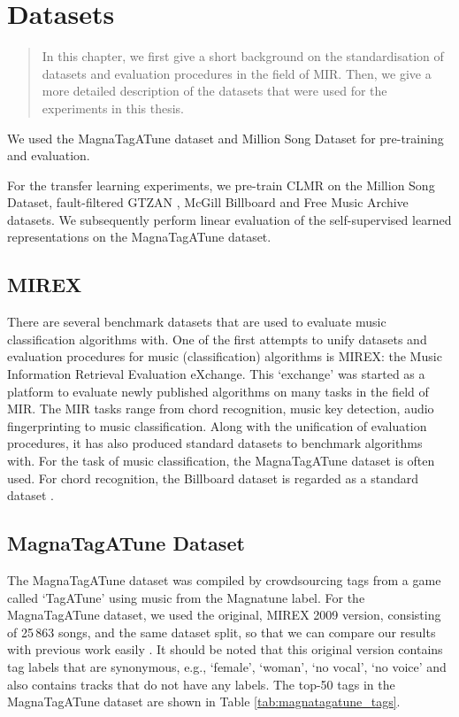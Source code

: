 \chapter{Datasets}

\begin{quote}
    In this chapter, we first give a short background on the standardisation of datasets and evaluation procedures in the field of MIR. Then, we give a more detailed description of the datasets that were used for the experiments in this thesis.
\end{quote}

We used the MagnaTagATune dataset and Million Song Dataset \cite{Bertin-Mahieux2011} for pre-training and evaluation.

For the transfer learning experiments, we pre-train CLMR on the Million Song Dataset, fault-filtered GTZAN \cite{tzanetakis2002musical,sturm2013gtzan}, McGill Billboard \cite{burgoyne_billboard} and Free Music Archive \cite{fma_dataset} datasets.
We subsequently perform linear evaluation of the self-supervised learned representations on the MagnaTagATune dataset.

\section{MIREX}
There are several benchmark datasets that are used to evaluate music classification algorithms with.
One of the first attempts to unify datasets and evaluation procedures for music (classification) algorithms is MIREX: the Music Information Retrieval Evaluation eXchange.
This `exchange' was started as a platform to evaluate newly published algorithms on many tasks in the field of MIR.
The MIR tasks range from chord recognition, music key detection, audio fingerprinting to music classification.
Along with the unification of evaluation procedures, it has also produced standard datasets to benchmark algorithms with.
For the task of music classification, the MagnaTagATune dataset \cite{law2009evaluation} is often used.
For chord recognition, the Billboard dataset is regarded as a standard dataset \cite{burgoyne_billboard}.


\section{MagnaTagATune Dataset}
The MagnaTagATune dataset was compiled by crowdsourcing tags from a game called `TagATune' using music from the Magnatune label.
For the MagnaTagATune dataset, we used the original, MIREX 2009 version, consisting of 25\,863 songs, and the same dataset split, so that we can compare our results with previous work easily \cite{pons_end--end_2017, lee2018samplecnn, dieleman_feature_learning}.
It should be noted that this original version contains tag labels that are synonymous, e.g., `female', `woman', `no vocal', `no voice' and also contains tracks that do not have any labels. The top-50 tags in the MagnaTagATune dataset are shown in Table \ref{tab:magnatagatune_tags}.

